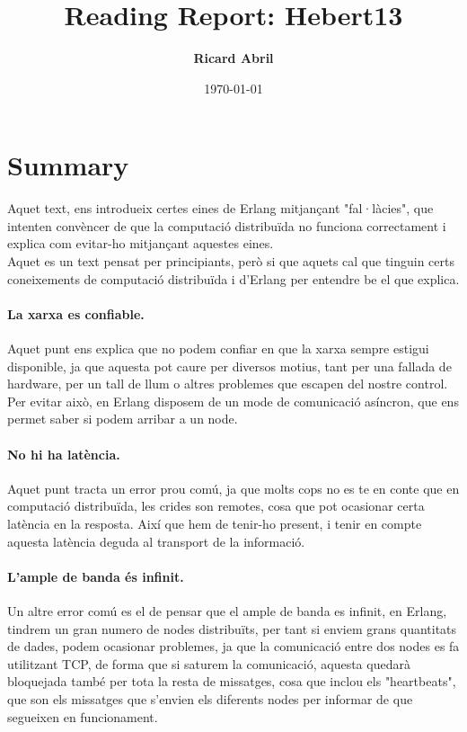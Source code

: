\documentclass[a4paper, 10pt]{article}
\title{Reading Report: Hebert13}
\author{\textbf{Ricard Abril}}
\date{\normalsize\today{}}
\begin{document}
\maketitle


\section{Summary}
Aquet text, ens introdueix certes eines de Erlang mitjançant "fal·làcies", que intenten convèncer de que la computació distribuïda no funciona correctament i explica com evitar-ho mitjançant aquestes eines.
\\Aquet es un text pensat per principiants, però si que aquets cal que tinguin certs coneixements de computació distribuïda i d'Erlang per entendre be el que explica.

\paragraph{La xarxa es confiable.\\}
\hspace{-0,55cm} Aquet punt ens explica que no podem confiar en que la xarxa sempre estigui disponible, ja que aquesta pot caure per diversos motius, tant per una fallada de hardware, per un tall de llum o altres problemes que escapen del nostre control.
Per evitar això, en Erlang disposem de un mode de comunicació asíncron, que ens permet saber si podem arribar a un node.

\paragraph{No hi ha latència.\\}
\hspace{-0,40cm}Aquet punt tracta un error prou comú, ja que molts cops no es te en conte que en computació distribuïda, les crides son remotes, cosa que pot ocasionar certa latència en la resposta. Així que hem de tenir-ho present, i tenir en compte aquesta latència deguda al transport de la informació.

\paragraph{L'ample de banda és infinit.\\}
\hspace{-0,40cm}Un altre error comú es el de pensar que el ample de banda es infinit, en Erlang, tindrem un gran numero de nodes distribuïts, per tant si enviem grans quantitats de dades, podem ocasionar problemes, ja que la comunicació entre dos nodes es fa utilitzant TCP, de forma que si saturem la comunicació, aquesta quedarà bloquejada també per tota la resta de missatges, cosa que inclou els "heartbeats", que son els missatges que s'envien els diferents nodes per informar de que segueixen en funcionament.
\end{document}
